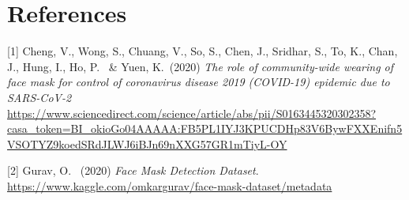 \section*{References}

\medskip

\small

[1] Cheng, V., Wong, S., Chuang, V., So, S., Chen, J., Sridhar, S., To, K., Chan, J., Hung, I., Ho, P. \ \& Yuen, K.\ (2020) {\it The role of community-wide wearing of face mask for control of coronavirus disease 2019 (COVID-19) epidemic due to SARS-CoV-2} \url{https://www.sciencedirect.com/science/article/abs/pii/S0163445320302358?casa_token=BI_okioGo04AAAAA:FB5PL1IYJ3KPUCDHp83V6BywFXXEnifn5VSOTYZ9koedSRdJLWJ6iBJn69nXXG57GR1mTiyL-OY}

[2] Gurav, O. \ (2020) {\it Face Mask Detection Dataset}. \url{https://www.kaggle.com/omkargurav/face-mask-dataset/metadata}



